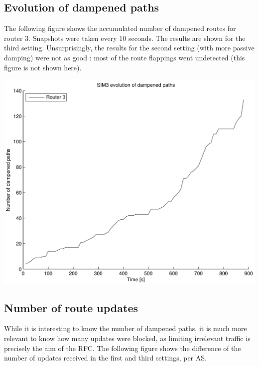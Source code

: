 \documentclass[a4paper,english]{IEEEtran}
\begin{document}
\subsection{Evolution of dampened paths}

The following figure shows the accumulated number of dampened routes for router 3.
Snapshots were taken every 10 seconds.
The results are shown for the third setting.
Unsurprisingly, the results for the second setting (with more passive damping) were not as good :
most of the route flappings went undetected (this figure is not shown here).

\begin{center}
\includegraphics[scale=.45]{img/SIM3_evolution_of_dampened_paths.pdf}
\end{center}

\subsection{Number of route updates}

While it is interesting to know the number of dampened paths, it is much more relevant to know
how many updates were blocked, as limiting irrelevant traffic is precisely the aim of the RFC.
The following figure shows the difference of the number of updates received in the first
and third settings, per AS.
\end{document}

